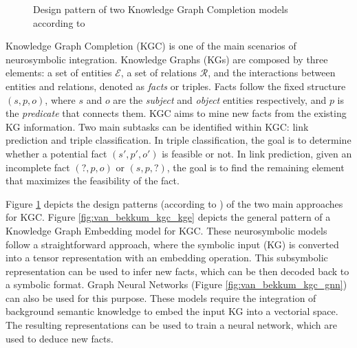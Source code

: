 \begin{figure}[t!]
    \centering
    \caption{Design pattern of two Knowledge Graph Completion models according to \cite{van_bekkum_modular_2021}}
    \label{fig:van_bekkum_kgc}
\end{figure}

Knowledge Graph Completion (KGC) \citep{nickel_review_ml_kg_2016,wang_kge_survey_2017} is one of the main scenarios of neurosymbolic integration. Knowledge Graphs (KGs) are composed by three elements: a set of entities $\mathcal{E}$, a set of relations $\mathcal{R}$, and the interactions between entities and relations, denoted as \textit{facts} or triples. Facts follow the fixed structure $(s,p,o)$, where $s$ and $o$ are the \textit{subject} and \textit{object} entities respectively, and $p$ is the \textit{predicate} that connects them. KGC aims to mine new facts from the existing KG information. Two main subtasks can be identified within KGC: link prediction and triple classification. In triple classification, the goal is to determine whether a potential fact $(s',p',o')$ is feasible or not. In link prediction, given an incomplete fact $(?,p,o)$ or $(s,p,?)$, the goal is to find the remaining element that maximizes the feasibility of the fact. 

Figure \ref{fig:van_bekkum_kgc} depicts the design patterns (according to \cite{van_bekkum_modular_2021}) of the two main approaches for KGC. Figure \ref{fig:van_bekkum_kgc_kge} depicts the general pattern of a Knowledge Graph Embedding model for KGC. These neurosymbolic models follow a straightforward approach, where the symbolic input (KG) is converted into a tensor representation with an embedding operation. This subsymbolic representation can be used to infer new facts, which can be then decoded back to a symbolic format. Graph Neural Networks (Figure \ref{fig:van_bekkum_kgc_gnn}) can also be used for this purpose. These models require the integration of background semantic knowledge to embed the input KG into a vectorial space. The resulting representations can be used to train a neural network, which are used to deduce new facts.

